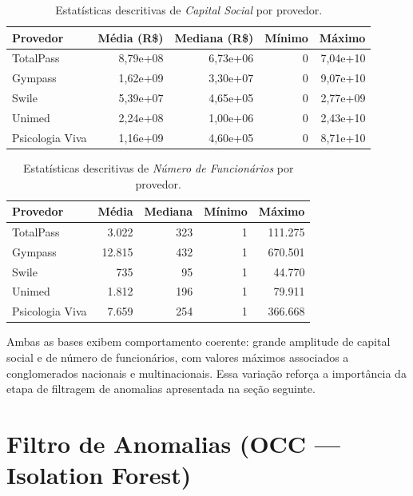 \begin{table}[H]
\centering
\caption{Estatísticas descritivas de \textit{Capital Social} por provedor.}
\label{tab:7_3a_capital}
\begin{tabular}{lrrrr}
\toprule
\textbf{Provedor} & \textbf{Média (R\$)} & \textbf{Mediana (R\$)} & \textbf{Mínimo} & \textbf{Máximo} \\
\midrule
TotalPass & 8,79e+08 & 6,73e+06 & 0 & 7,04e+10 \\
Gympass & 1,62e+09 & 3,30e+07 & 0 & 9,07e+10 \\
Swile & 5,39e+07 & 4,65e+05 & 0 & 2,77e+09 \\
Unimed & 2,24e+08 & 1,00e+06 & 0 & 2,43e+10 \\
Psicologia Viva & 1,16e+09 & 4,60e+05 & 0 & 8,71e+10 \\
\bottomrule
\end{tabular}
\end{table}

\begin{table}[H]
\centering
\caption{Estatísticas descritivas de \textit{Número de Funcionários} por provedor.}
\label{tab:7_3b_funcionarios}
\begin{tabular}{lrrrr}
\toprule
\textbf{Provedor} & \textbf{Média} & \textbf{Mediana} & \textbf{Mínimo} & \textbf{Máximo} \\
\midrule
TotalPass & 3.022 & 323 & 1 & 111.275 \\
Gympass & 12.815 & 432 & 1 & 670.501 \\
Swile & 735 & 95 & 1 & 44.770 \\
Unimed & 1.812 & 196 & 1 & 79.911 \\
Psicologia Viva & 7.659 & 254 & 1 & 366.668 \\
\bottomrule
\end{tabular}
\end{table}

Ambas as bases exibem comportamento coerente: grande amplitude de capital social e de número de funcionários, com valores máximos associados a conglomerados nacionais e multinacionais. Essa variação reforça a importância da etapa de filtragem de anomalias apresentada na seção seguinte.


\section{Filtro de Anomalias (OCC — Isolation Forest)}

